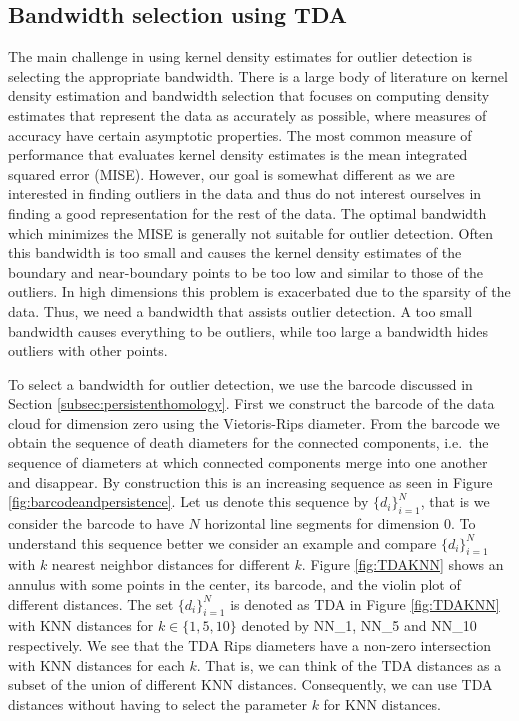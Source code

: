 \documentclass[11pt,a4paper,]{article}
\theoremstyle{definition}
\theoremstyle{definition}
\theoremstyle{definition}
\theoremstyle{remark}
\begin{document}
\hypertarget{subsec:selectingBandwidth}{%
\subsection{Bandwidth selection using TDA}\label{subsec:selectingBandwidth}}

The main challenge in using kernel density estimates for outlier detection is selecting the appropriate bandwidth. There is a large body of literature on kernel density estimation and bandwidth selection \autocite{Scott1994,Wang2019} that focuses on computing density estimates that represent the data as accurately as possible, where measures of accuracy have certain asymptotic properties. The most common measure of performance that evaluates kernel density estimates is the mean integrated squared error (MISE). However, our goal is somewhat different as we are interested in finding outliers in the data and thus do not interest ourselves in finding a good representation for the rest of the data. The optimal bandwidth which minimizes the MISE is generally not suitable for outlier detection. Often this bandwidth is too small and causes the kernel density estimates of the boundary and near-boundary points to be too low and similar to those of the outliers. In high dimensions this problem is exacerbated due to the sparsity of the data. Thus, we need a bandwidth that assists outlier detection. A too small bandwidth causes everything to be outliers, while too large a bandwidth hides outliers with other points.

To select a bandwidth for outlier detection, we use the barcode discussed in Section \ref{subsec:persistenthomology}. First we construct the barcode of the data cloud for dimension zero using the Vietoris-Rips diameter. From the barcode we obtain the sequence of death diameters for the connected components, i.e.~the sequence of diameters at which connected components merge into one another and disappear. By construction this is an increasing sequence as seen in Figure \ref{fig:barcodeandpersistence}. Let us denote this sequence by \(\{d_i\}_{i = 1}^N\), that is we consider the barcode to have \(N\) horizontal line segments for dimension \(0\). To understand this sequence better we consider an example and compare \(\{d_i\}_{i = 1}^N\) with \(k\) nearest neighbor distances for different \(k\). Figure \ref{fig:TDAKNN} shows an annulus with some points in the center, its barcode, and the violin plot of different distances. The set \(\{d_i\}_{i = 1}^N\) is denoted as TDA in Figure \ref{fig:TDAKNN} with KNN distances for \(k \in \{1, 5, 10\}\) denoted by NN\_1, NN\_5 and NN\_10 respectively. We see that the TDA Rips diameters have a non-zero intersection with KNN distances for each \(k\). That is, we can think of the TDA distances as a subset of the union of different KNN distances. Consequently, we can use TDA distances without having to select the parameter \(k\) for KNN distances.
\end{document}
